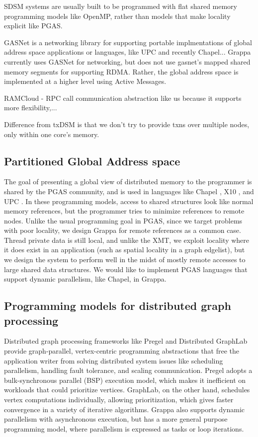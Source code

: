 SDSM systems are usually built to be programmed with flat shared memory programming models like OpenMP, rather than models that make locality explicit like PGAS. 


GASNet is a networking library for supporting portable implmentations of global address space applications or languages, like UPC and recently Chapel...
Grappa currently uses GASNet for networking, but does not use gasnet's mapped shared memory segments for supporting RDMA. Rather, the global address space is implemented at a higher level using Active Messages.

RAMCloud - RPC call communication abstraction like us because it supports more flexibility,...


Difference from txDSM \cite{sdsm with txn coherence} is that we don't try to provide txns over multiple nodes, only within one core's memory.

\subsection{Partitioned Global Address space}
The goal of presenting a global view of distributed memory to the programmer is shared by the PGAS community, and is used in languages like Chapel \cite{Chapel}, X10 \cite{X10}, and UPC \cite{UPC}. In these programming models, access to shared structures look like normal memory references, but the programmer tries to minimize references to remote nodes. Unlike the usual programming goal in PGAS, since we target problems with poor locality, we design Grappa for remote references as a common case. Thread private data is still local, and unlike the XMT, we exploit locality where it does exist in an application (such as spatial locality in a graph edgelist), but we design the system to perform well in the midst of mostly remote accesses to large shared data structures. We would like to implement PGAS languages that support dynamic parallelism, like Chapel, in Grappa.

\subsection{Programming models for distributed graph processing}

Distributed graph processing frameworks like Pregel \cite{pregel:2010} and Distributed GraphLab \cite{distgraphlab:vldb12} provide graph-parallel, vertex-centric programming abstractions that free the application writer from solving distributed system issues like scheduling parallelism, handling fault tolerance, and scaling communication. Pregel adopts a bulk-synchronous parallel (BSP) execution model, which makes it inefficient on workloads that could prioritize vertices. GraphLab, on the other hand, schedules vertex computations individually, allowing prioritization, which gives faster convergence in a variety of iterative algorithms. Grappa also supports dynamic parallelism with asynchronous execution, but has a more general purpose programming model, where parallelism is expressed as tasks or loop iterations. 

